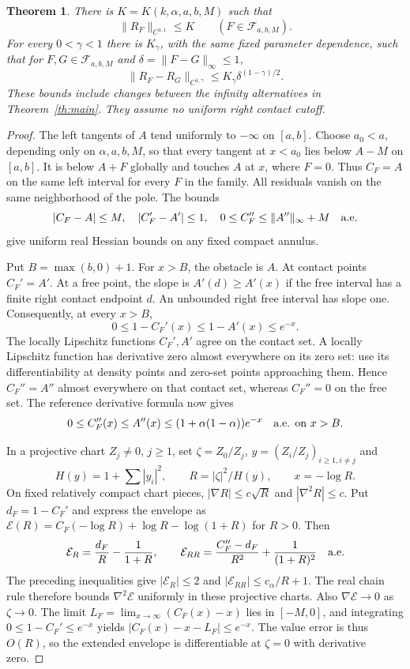 \documentclass[11pt]{article}
\newtheorem{theorem}{Theorem}
\theoremstyle{remark}\newtheorem{remark}[theorem]{Remark}
\begin{document}
\begin{theorem}\label{th:uniform}
There is $K=K(k,\alpha,a,b,M)$ such that
\[
 \|R_F\|_{C^{1,1}}\le K\qquad(F\in\mathcal F_{a,b,M}).
\]
For every $0<\gamma<1$ there is $K_\gamma$, with the same fixed
parameter dependence, such that for $F,G\in\mathcal F_{a,b,M}$ and
$\delta=\|F-G\|_\infty\le1$,
\[
 \|R_F-R_G\|_{C^{1,\gamma}}
       \le K_\gamma\delta^{(1-\gamma)/2}.
\]
These bounds include changes between the infinity alternatives in
Theorem~\ref{th:main}. They assume no uniform right contact cutoff.
\end{theorem}
\begin{proof}
The left tangents of $A$ tend uniformly to $-\infty$ on $[a,b]$.
Choose $a_0<a$, depending only on $\alpha,a,b,M$, so that every
tangent at $x<a_0$ lies below $A-M$ on $[a,b]$. It is below
$A+F$ globally and touches $A$ at $x$, where $F=0$.
Thus $C_F=A$ on the same left interval for every $F$ in the family.
All residuals vanish on the same neighborhood of the pole.
The bounds
\[
 |C_F-A|\le M,\quad |C_F'-A'|\le1,\quad
 0\le C_F''\le\|A''\|_\infty+M\quad\hbox{a.e.}
\]
give uniform real Hessian bounds on any fixed compact annulus.

Put $B=\max(b,0)+1$. For $x>B$, the obstacle is $A$.
At contact points $C_F'=A'$. At a free point, the slope is
$A'(d)\ge A'(x)$ if the free interval has a finite right contact
endpoint $d$. An unbounded right free interval has slope one.
Consequently, at every $x>B$,
\[
 0\le1-C_F'(x)\le1-A'(x)\le e^{-x}.
\]
The locally Lipschitz functions $C_F',A'$ agree on the contact set.
A locally Lipschitz function has derivative zero almost everywhere
on its zero set: use its differentiability at density points and
zero-set points approaching them. Hence $C_F''=A''$ almost
everywhere on that contact set, whereas $C_F''=0$ on the free set.
The reference derivative formula now gives
\[
 0\le C_F''(x)\le A''(x)
       \le(1+\alpha(1-\alpha))e^{-x}\quad\hbox{a.e. on }x>B.
\]

In a projective chart $Z_j\ne0$, $j\ge1$, set
$\zeta=Z_0/Z_j$, $y=(Z_i/Z_j)_{i\ge1,i\ne j}$ and
\[
 H(y)=1+\sum|y_i|^2,\qquad R=|\zeta|^2/H(y),\qquad x=-\log R.
\]
On fixed relatively compact chart pieces,
$|\nabla R|\le c\sqrt R$ and $|\nabla^2R|\le c$.
Put $d_F=1-C_F'$ and express the envelope as
$\mathcal E(R)=C_F(-\log R)+\log R-\log(1+R)$ for $R>0$.
Then
\[
 \mathcal E_R=\frac{d_F}{R}-\frac1{1+R},\qquad
 \mathcal E_{RR}=\frac{C_F''-d_F}{R^2}+\frac1{(1+R)^2}
 \quad\hbox{a.e.}
\]
The preceding inequalities give $|\mathcal E_R|\le2$ and
$|\mathcal E_{RR}|\le c_\alpha/R+1$. The real chain rule therefore
bounds $\nabla^2\mathcal E$ uniformly in these projective charts.
Also $\nabla\mathcal E\to0$ as $\zeta\to0$.
The limit $L_F=\lim_{x\to\infty}(C_F(x)-x)$ lies in $[-M,0]$, and
integrating $0\le1-C_F'\le e^{-x}$ yields
$|C_F(x)-x-L_F|\le e^{-x}$.
The value error is thus $O(R)$, so the extended envelope is
differentiable at $\zeta=0$ with derivative zero.


\end{proof}
\end{document}
